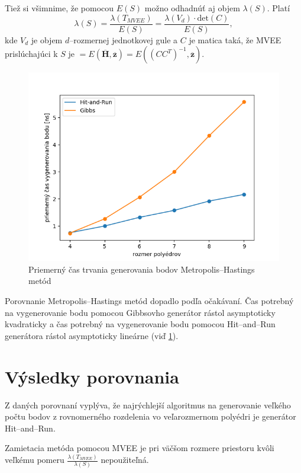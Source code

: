 Tiež si všimnime, že pomocou $E(S)$ možno odhadnúť aj objem $\lambda(S)$. Platí $$\lambda(S)=\frac{\lambda(T_{MVEE})}{E(S)}=\frac{\lambda(V_d) \cdot \text{det}(C)}{E(S)},$$ kde $V_d$ je objem $d$--rozmernej jednotkovej gule a $C$ je matica taká, že MVEE prislúchajúci k $S$ je $=E(\mathbf{\overline H, \overline z})=E((CC^T)^{-1}, \mathbf{ \overline z})$.

\begin{figure} [H]
  \includegraphics[width=\linewidth]{images/mh.png}
  \caption{Priemerný čas trvania generovania bodov Metropolis--Hastings metód}
  \label{fig:mh}
\end{figure}

Porovnanie Metropolis--Hastings metód dopadlo podľa očakávaní. Čas potrebný na vygenerovanie bodu pomocou Gibbsovho generátor rástol asymptoticky kvadraticky a čas potrebný na vygenerovanie bodu pomocou Hit--and--Run generátora rástol asymptoticky lineárne (viď \ref{fig:mh}).

\section{Výsledky porovnania}

Z daných porovnaní vyplýva, že najrýchlejší algoritmus na generovanie veľkého počtu bodov z rovnomerného rozdelenia vo veľarozmernom polyédri je generátor Hit--and--Run.

Zamietacia metóda pomocou MVEE je pri väčšom rozmere priestoru kvôli veľkému pomeru $\frac{\lambda(T_{MVEE})}{\lambda(S)}$ nepoužiteľná.\\

